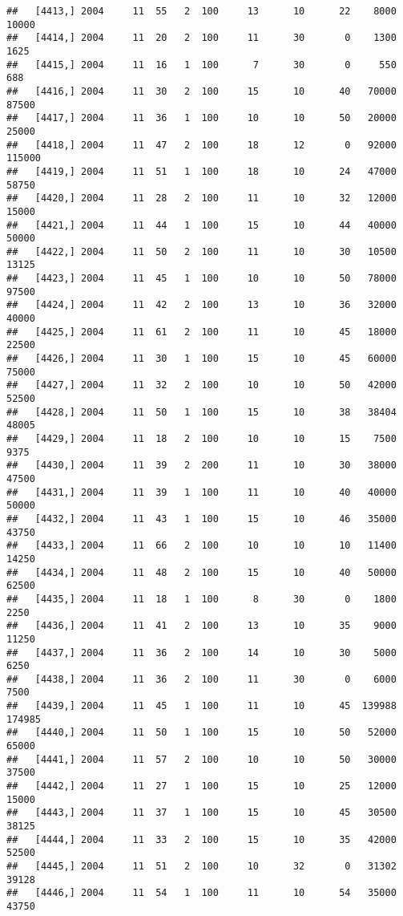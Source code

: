\documentclass{article}\usepackage[]{graphicx}\usepackage[]{color}
\makeatletter
\newenvironment{kframe}{%
 \def\at@end@of@kframe{}%
 \ifinner\ifhmode%
  \def\at@end@of@kframe{\end{minipage}}%
  \begin{minipage}{\columnwidth}%
 \fi\fi%
 \def\FrameCommand##1{\hskip\@totalleftmargin \hskip-\fboxsep
 \colorbox{shadecolor}{##1}\hskip-\fboxsep
     \hskip-\linewidth \hskip-\@totalleftmargin \hskip\columnwidth}%
 \MakeFramed {\advance\hsize-\width
   \@totalleftmargin\z@ \linewidth\hsize
   \@setminipage}}%
 {\par\unskip\endMakeFramed%
 \at@end@of@kframe}
\newenvironment{knitrout}{}{} %
\makeatother
\begin{document}
\begin{knitrout}
\begin{kframe}
\begin{verbatim}
##   [4413,] 2004     11  55   2  100     13      10      22    8000   10000
##   [4414,] 2004     11  20   2  100     11      30       0    1300    1625
##   [4415,] 2004     11  16   1  100      7      30       0     550     688
##   [4416,] 2004     11  30   2  100     15      10      40   70000   87500
##   [4417,] 2004     11  36   1  100     10      10      50   20000   25000
##   [4418,] 2004     11  47   2  100     18      12       0   92000  115000
##   [4419,] 2004     11  51   1  100     18      10      24   47000   58750
##   [4420,] 2004     11  28   2  100     11      10      32   12000   15000
##   [4421,] 2004     11  44   1  100     15      10      44   40000   50000
##   [4422,] 2004     11  50   2  100     11      10      30   10500   13125
##   [4423,] 2004     11  45   1  100     10      10      50   78000   97500
##   [4424,] 2004     11  42   2  100     13      10      36   32000   40000
##   [4425,] 2004     11  61   2  100     11      10      45   18000   22500
##   [4426,] 2004     11  30   1  100     15      10      45   60000   75000
##   [4427,] 2004     11  32   2  100     10      10      50   42000   52500
##   [4428,] 2004     11  50   1  100     15      10      38   38404   48005
##   [4429,] 2004     11  18   2  100     10      10      15    7500    9375
##   [4430,] 2004     11  39   2  200     11      10      30   38000   47500
##   [4431,] 2004     11  39   1  100     11      10      40   40000   50000
##   [4432,] 2004     11  43   1  100     15      10      46   35000   43750
##   [4433,] 2004     11  66   2  100     10      10      10   11400   14250
##   [4434,] 2004     11  48   2  100     15      10      40   50000   62500
##   [4435,] 2004     11  18   1  100      8      30       0    1800    2250
##   [4436,] 2004     11  41   2  100     13      10      35    9000   11250
##   [4437,] 2004     11  36   2  100     14      10      30    5000    6250
##   [4438,] 2004     11  36   2  100     11      30       0    6000    7500
##   [4439,] 2004     11  45   1  100     11      10      45  139988  174985
##   [4440,] 2004     11  50   1  100     15      10      50   52000   65000
##   [4441,] 2004     11  57   2  100     10      10      50   30000   37500
##   [4442,] 2004     11  27   1  100     15      10      25   12000   15000
##   [4443,] 2004     11  37   1  100     15      10      45   30500   38125
##   [4444,] 2004     11  33   2  100     15      10      35   42000   52500
##   [4445,] 2004     11  51   2  100     10      32       0   31302   39128
##   [4446,] 2004     11  54   1  100     11      10      54   35000   43750

\end{verbatim}
\end{kframe}
\end{knitrout}
\end{document}
